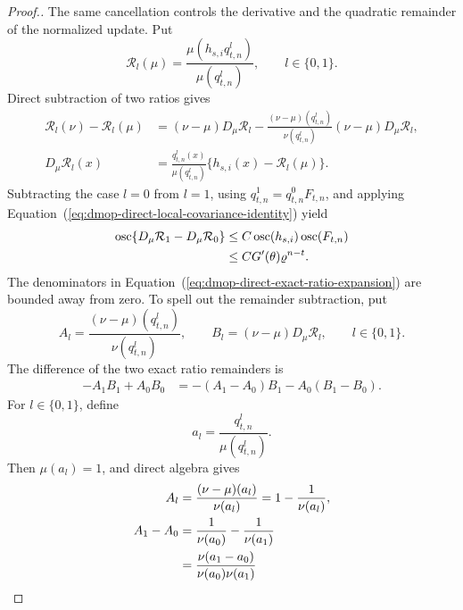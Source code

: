 \documentclass[11pt]{article}
\theoremstyle{thmstylethree}%
\begin{document}
\begin{proof}[Proof.]
The same cancellation controls the derivative and the quadratic
remainder of the normalized update.  Put
\begin{equation}
\mathcal R_l(\mu)
=\frac{\mu(h_{s,i}q_{t,n}^{l})}{\mu(q_{t,n}^{l})},
\qquad l\in\{0,1\}.
\end{equation}
Direct subtraction of two ratios gives
\begin{align}
\mathcal R_l(\nu)-\mathcal R_l(\mu)
&=(\nu-\mu)D_\mu\mathcal R_l
-
\frac{(\nu-\mu)(q_{t,n}^{l})}
{\nu(q_{t,n}^{l})}
(\nu-\mu)D_\mu\mathcal R_l,
\label{eq:dmop-direct-exact-ratio-expansion}
\\
D_\mu\mathcal R_l(x)
&=
\frac{q_{t,n}^{l}(x)}{\mu(q_{t,n}^{l})}
\{h_{s,i}(x)-\mathcal R_l(\mu)\}.
\label{eq:dmop-direct-ratio-derivative}
\end{align}
Subtracting the case $l=0$ from $l=1$, using
$q_{t,n}^{1}=q_{t,n}^{0}F_{t,n}$, and applying
Equation~(\ref{eq:dmop-direct-local-covariance-identity}) yield
\begin{align}
\operatorname{osc}
\{D_\mu\mathcal R_1-D_\mu\mathcal R_0\}
&\leq
C\operatorname{osc}(h_{s,i})
\operatorname{osc}(F_{t,n})                               \notag\\
&\leq
CG'(\theta)\varrho^{n-t}.
\label{eq:dmop-direct-local-derivative-oscillation}
\end{align}
The denominators in
Equation~(\ref{eq:dmop-direct-exact-ratio-expansion}) are bounded away
from zero.  To spell out the remainder subtraction, put
\begin{equation}
A_l=\frac{(\nu-\mu)(q_{t,n}^{l})}{\nu(q_{t,n}^{l})},
\qquad
B_l=(\nu-\mu)D_\mu\mathcal R_l,
\qquad l\in\{0,1\}.
\end{equation}
The difference of the two exact ratio remainders is
\begin{align}
-A_1B_1+A_0B_0
&=-(A_1-A_0)B_1-A_0(B_1-B_0).
\label{eq:dmop-direct-two-remainder-products}
\end{align}
For $l\in\{0,1\}$, define
\begin{equation}
a_l=\frac{q_{t,n}^{l}}{\mu(q_{t,n}^{l})}.
\label{eq:dmop-direct-local-normalized-denominators}
\end{equation}
Then $\mu(a_l)=1$, and direct algebra gives
\begin{align}
A_l
&=\frac{(\nu-\mu)(a_l)}{\nu(a_l)}
=1-\frac1{\nu(a_l)},                                      \notag\\
A_1-A_0
&=
\frac1{\nu(a_0)}-\frac1{\nu(a_1)}                         \notag\\
&=
\frac{\nu(a_1-a_0)}{\nu(a_0)\nu(a_1)}                    \notag\\

\end{align}
\end{proof}
\end{document}
